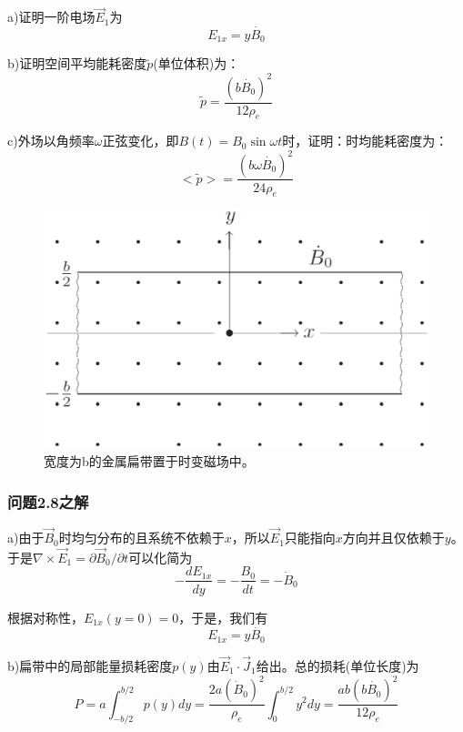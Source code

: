 a)证明一阶电场$\vec{E}_1$为
\begin{equation}
E_{1x}=y\dot{B_0}
\end{equation}

b)证明空间平均能耗密度$\tilde{p}$(单位体积)为：
\begin{equation}
\tilde{p}=\frac{(b\dot{B_0})^2}{12\rho_e}
\end{equation}

c)外场以角频率$\omega$正弦变化，即$B(t)=B_0 \sin\omega t$时，证明：时均能耗密度为：
\begin{equation}
<\tilde{p}>=\frac{(b\omega\dot{B_0})^2}{24\rho_e}
\end{equation}

\begin{figure}[htbp]
  \centering
 \includegraphics[scale=0.4]{chpt2/figs/fig2.13.eps}
  \caption{宽度为b的金属扁带置于时变磁场中。}
\end{figure}

\subsubsection{问题2.8之解}
a)由于$\vec{B}_0$时均匀分布的且系统不依赖于$x$，所以$\vec{E}_1$只能指向$x$方向并且仅依赖于$y$。于是$\nabla\times \vec{E}_1=\partial \vec{B}_0/\partial t$可以化简为
\begin{equation*}
-\frac{dE_{1x}}{dy}=-\frac{B_0}{dt}=-\dot{B}_0 \tag{S8.1}
\end{equation*}

根据对称性，$E_{1x}(y=0)=0$，于是，我们有
\begin{equation*}
E_{1x}=y\dot{B_0}  \tag{2.66}
\end{equation*}

b)扁带中的局部能量损耗密度$p(y)$由$\vec{E}_1\cdot\vec{J}_1$给出。总的损耗(单位长度)为
\begin{equation*}
P=a\int_{-b/2}^{b/2}p(y)dy=\frac{2a(\dot{B}_0)^2}{\rho_e}\int_{0}^{b/2}y^2dy=\frac{ab(b\dot{B_0})^2}{12\rho_e}  \tag{S8.2}
\end{equation*}

